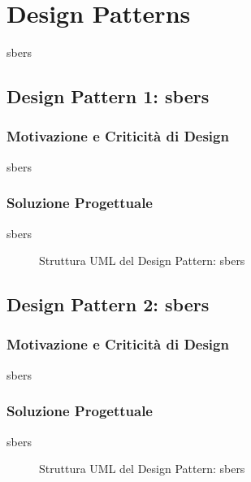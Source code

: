 \section{Design Patterns}

sbers

\subsection{Design Pattern 1: sbers}

\subsubsection{Motivazione e Criticità di Design}
sbers

\subsubsection{Soluzione Progettuale}
sbers

\begin{figure}[H]
    \centering
    \caption{Struttura UML del Design Pattern: sbers}
    \label{fig:pattern_01}
\end{figure}

\subsection{Design Pattern 2: sbers}

\subsubsection{Motivazione e Criticità di Design}
sbers

\subsubsection{Soluzione Progettuale}
sbers

\begin{figure}[H]
    \centering
    \caption{Struttura UML del Design Pattern: sbers}
    \label{fig:pattern_02}
\end{figure}
